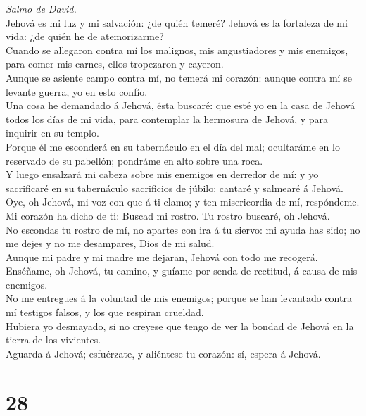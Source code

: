  \emph{Salmo de David.}\\
Jehová es mi luz y mi salvación: ¿de quién temeré? Jehová es la
fortaleza de mi vida: ¿de quién he de atemorizarme?\\
 Cuando se allegaron contra mí los malignos, mis
angustiadores y mis enemigos, para comer mis carnes, ellos tropezaron y
cayeron.\\
 Aunque se asiente campo contra mí, no temerá mi corazón:
aunque contra mí se levante guerra, yo en esto confío.\\
 Una cosa he demandado á Jehová, ésta buscaré: que esté yo
en la casa de Jehová todos los días de mi vida, para contemplar la
hermosura de Jehová, y para inquirir en su templo.\\
 Porque él me esconderá en su tabernáculo en el día del mal;
ocultaráme en lo reservado de su pabellón; pondráme en alto sobre una
roca.\\
 Y luego ensalzará mi cabeza sobre mis enemigos en derredor
de mí: y yo sacrificaré en su tabernáculo sacrificios de júbilo: cantaré
y salmearé á Jehová.\\
 Oye, oh Jehová, mi voz con que á ti clamo; y ten
misericordia de mí, respóndeme.\\
 Mi corazón ha dicho de ti: Buscad mi rostro. Tu rostro
buscaré, oh Jehová.\\
 No escondas tu rostro de mí, no apartes con ira á tu
siervo: mi ayuda has sido; no me dejes y no me desampares, Dios de mi
salud.\\
 Aunque mi padre y mi madre me dejaran, Jehová con todo me
recogerá.\\
 Enséñame, oh Jehová, tu camino, y guíame por senda de
rectitud, á causa de mis enemigos.\\
 No me entregues á la voluntad de mis enemigos; porque se
han levantado contra mí testigos falsos, y los que respiran crueldad.\\
 Hubiera yo desmayado, si no creyese que tengo de ver la
bondad de Jehová en la tierra de los vivientes.\\
 Aguarda á Jehová; esfuérzate, y aliéntese tu corazón: sí,
espera á Jehová.

\hypertarget{section-27}{%
\section{28}\label{section-27}}

